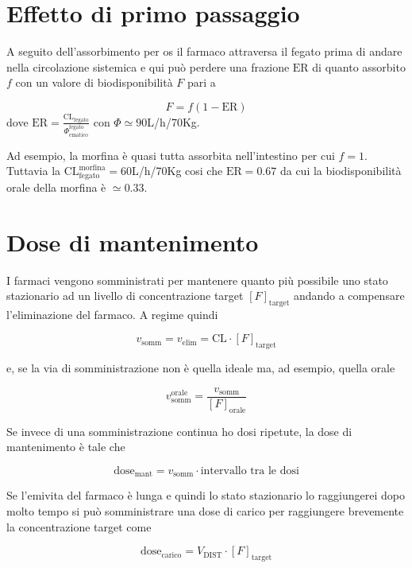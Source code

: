 \section{Effetto di primo passaggio}

A seguito dell'assorbimento per os il farmaco attraversa il fegato prima di andare nella circolazione sistemica e qui può perdere una frazione $\text{ER}$ di quanto assorbito $f$ con un valore di biodisponibilità $F$ pari a 

$$F=f(1-\text{ER})$$
dove $\text{ER} = \displaystyle\frac{\text{CL}_{\text{fegato}}}{\Phi^{\text{fegato}}_{\text{ematico}}}$ con $\Phi\simeq 90$L/h/70Kg.

Ad esempio, la morfina è quasi tutta assorbita nell'intestino per cui $f=1$. Tuttavia la $\text{CL}_{\text{fegato}}^{\text{morfina}} = 60$L/h/70Kg cosi che $\text{ER}=0.67$ da cui la biodisponibilità orale della morfina è $\simeq 0.33$.

\section{Dose di mantenimento}

I farmaci vengono somministrati per mantenere quanto più possibile uno stato stazionario ad un livello di concentrazione target $[F]_\text{target}$ andando a compensare l'eliminazione del farmaco. A regime quindi

$$v_\text{somm} = v_\text{elim} = \text{CL}\cdot[F]_\text{target}$$

e, se la via di somministrazione non è quella ideale ma, ad esempio, quella orale

$$v_\text{somm}^\text{orale} = \frac{v_\text{somm}}{[F]_\text{orale}}$$

Se invece di una somministrazione continua ho dosi ripetute, la dose di mantenimento è tale che 

$$\text{dose}_\text{mant} = v_\text{somm} \cdot \text{intervallo tra le dosi}$$

Se l'emivita del farmaco è lunga e quindi lo stato stazionario lo raggiungerei dopo molto tempo si può somministrare una dose di carico per raggiungere brevemente la concentrazione target come

$$\text{dose}_\text{carico} = V_\text{DIST} \cdot [F]_\text{target}$$



